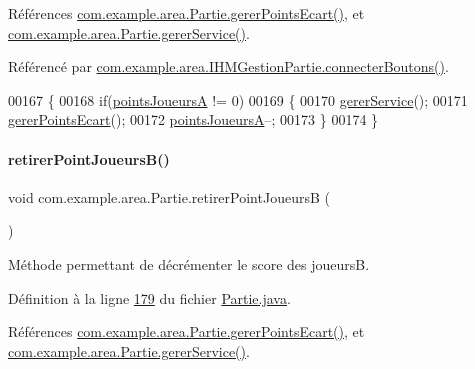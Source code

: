Références \hyperlink{_partie_8java_source_l00204}{com.\+example.\+area.\+Partie.\+gerer\+Points\+Ecart()}, et \hyperlink{_partie_8java_source_l00220}{com.\+example.\+area.\+Partie.\+gerer\+Service()}.



Référencé par \hyperlink{_i_h_m_gestion_partie_8java_source_l00346}{com.\+example.\+area.\+I\+H\+M\+Gestion\+Partie.\+connecter\+Boutons()}.


\begin{DoxyCode}
00167     \{
00168         \textcolor{keywordflow}{if}(\hyperlink{classcom_1_1example_1_1area_1_1_partie_ad1075e561acb71ac3307570f79795b1c}{pointsJoueursA} != 0)
00169         \{
00170             \hyperlink{classcom_1_1example_1_1area_1_1_partie_a52c8e133b23468d4b2c4338a80c3763c}{gererService}();
00171             \hyperlink{classcom_1_1example_1_1area_1_1_partie_a2838da99f206d736a22f8a3f271365b2}{gererPointsEcart}();
00172             \hyperlink{classcom_1_1example_1_1area_1_1_partie_ad1075e561acb71ac3307570f79795b1c}{pointsJoueursA}--;
00173         \}
00174     \}
\end{DoxyCode}
\mbox{\label{classcom_1_1example_1_1area_1_1_partie_aa3f7d2c68dcf31a2e48f95c5db9c5663}} 
\paragraph{\texorpdfstring{retirer\+Point\+Joueurs\+B()}{retirerPointJoueursB()}}
{\footnotesize\ttfamily void com.\+example.\+area.\+Partie.\+retirer\+Point\+JoueursB (\begin{DoxyParamCaption}{ }\end{DoxyParamCaption})}



Méthode permettant de décrémenter le score des joueursB. 



Définition à la ligne \hyperlink{_partie_8java_source_l00179}{179} du fichier \hyperlink{_partie_8java_source}{Partie.\+java}.



Références \hyperlink{_partie_8java_source_l00204}{com.\+example.\+area.\+Partie.\+gerer\+Points\+Ecart()}, et \hyperlink{_partie_8java_source_l00220}{com.\+example.\+area.\+Partie.\+gerer\+Service()}.



